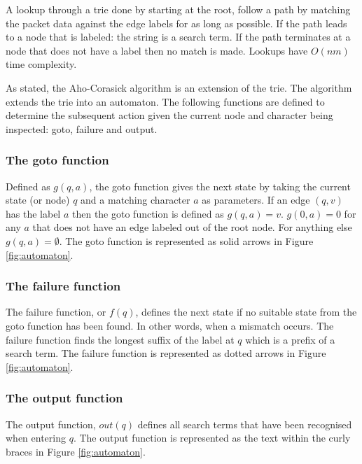 \documentclass{article}
\begin{document}
A lookup through a trie done by starting at the root, follow a path by matching the packet data against the edge labels for as long as possible. If the path leads to a node that is labeled: the string is a search term. If the path terminates at a node that does not have a label then no match is made. Lookups have \(O(nm)\) time complexity.

As stated, the Aho-Corasick algorithm is an extension of the trie. The algorithm extends the trie into an automaton. The following functions are defined to determine the subsequent action given the current node and character being inspected: goto, failure and output.

\subsubsection{The goto function} \label{goto-function}

Defined as \(g(q, a)\), the goto function gives the next state by taking the current state (or node) \(q\) and a matching character \(a\) as parameters. If an edge \((q, v)\) has the label \(a\) then the goto function is defined as \(g(q, a) = v\). \(g(0, a) = 0\) for any \(a\) that does not have an edge labeled out of the root node. For anything else \(g(q, a) =  \emptyset\). The goto function is represented as solid arrows in Figure \ref{fig:automaton}.

\subsubsection{The failure function} \label{failure-function}

The failure function, or \(f(q)\), defines the next state if no suitable state from the goto function has been found. In other words, when a mismatch occurs. The failure function finds the longest suffix of the label at \(q\) which is a prefix of a search term. The failure function is represented as dotted arrows in Figure \ref{fig:automaton}.

\subsubsection{The output function} \label{output-function}

The output function, \(out(q)\) defines all search terms that have been recognised when entering \(q\). The output function is represented as the text within the curly braces in Figure \ref{fig:automaton}.
\end{document}
